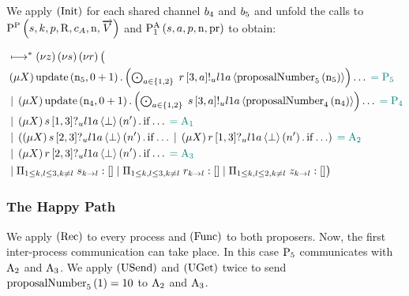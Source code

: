 We apply $\RInit$ for each shared channel $\SharedPoint{4}$ and $\SharedPoint{5}$ and unfold the calls to $\Pp{\ChannelS, \ProcessIndexK, \ProposerRole, \QRoles, \AcceptorCount, \NumberRegister, \VectorV}$ and $\Call{\PaOne}{\ChannelS, \AcceptorRole, \ProposerRole, \NumberRegister, \ProposalRegister}$ to obtain:

\begin{align*}
&\mapstostar \NuChannels\big (\\
&\Mu{\RecursionVariable} \update{\NumberRegister_5}{0 + 1} . \DotForall{\AcceptorRole\in \Curly{1, 2}}{\SendUnreliableP{\ChannelR}{3}{\AcceptorRole}{\LOneA}{\proposalNumber{\NumberRegister_5}{5}}}\ldots \comment{= \Proposer{5}}\\
&\Or \Mu{\RecursionVariable} \update{\NumberRegister_4}{0 + 1} . \DotForall{\AcceptorRole\in \Curly{1, 2}}{\SendUnreliableP{\ChannelS}{3}{\AcceptorRole}{\LOneA}{\proposalNumber{\NumberRegister_4}{4}}}\ldots \comment{= \Proposer{4}}\\
&\Or \Mu{\RecursionVariable} \ReceiveUnreliableP{\ChannelS}{1}{3}{\LOneA}{\bot}{n'}.\If{\ldots} \comment{= \Acceptor{1}}\\
&\Or \Paren{
    \Mu{\RecursionVariable} \ReceiveUnreliableP{\ChannelS}{2}{3}{\LOneA}{\bot}{n'}.\If{\ldots}
    \Or \Mu{\RecursionVariable} \ReceiveUnreliableP{\ChannelR}{1}{3}{\LOneA}{\bot}{n'}.\If{\ldots}
} \comment{= \Acceptor{2}}\\
&\Or \Mu{\RecursionVariable} \ReceiveUnreliableP{\ChannelR}{2}{3}{\LOneA}{\bot}{n'}.\If{\ldots} \comment{= \Acceptor{3}}\\
&\Or \InnerSessionQueues{\ChannelS}
\Or \InnerSessionQueues{\ChannelR}
\Or \OuterSessionQueues
\big )
\end{align*}

\subsubsection{The Happy Path}
We apply $\RRec$ to every process and $\RSideEffect$ to both proposers.
Now, the first inter-process communication can take place.
In this case $\Proposer{5}$ communicates with $\Acceptor{2}$ and $\Acceptor{3}$.
We apply $\RUsend$ and $\RUget$ twice to send $\proposalNumber{1}{5} = 10$ to $\Acceptor{2}$ and $\Acceptor{3}$.


